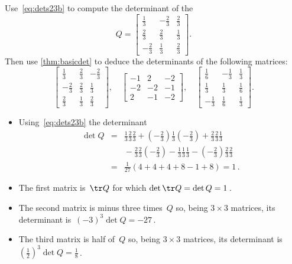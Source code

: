 \begin{example} \label{eg:}
Use~\eqref{eq:dets23b} to compute the determinant of the 
\begin{equation*}
Q=\begin{bmatrix} \frac13&-\frac23&\frac23
\\\frac23&\frac23&\frac13
\\-\frac23&\frac13&\frac23 \end{bmatrix}.
\end{equation*}
Then use \autoref{thm:basicdet} to deduce the determinants of the following matrices:
\begin{equation*}
\begin{bmatrix} \frac13&\frac23&-\frac23
\\-\frac23&\frac23&\frac13
\\\frac23&\frac13&\frac23 \end{bmatrix}
,\quad
\begin{bmatrix} -1&2&-2
\\-2&-2&-1
\\2&-1&-2 \end{bmatrix}
,\quad
\begin{bmatrix} \frac16&-\frac13&\frac13
\\\frac13&\frac13&\frac16
\\-\frac13&\frac16&\frac13 \end{bmatrix}.
\end{equation*}

\begin{solution} 
\begin{itemize}
\item Using~\eqref{eq:dets23b} the determinant
\begin{eqnarray*}
\det Q&=&\tfrac13\tfrac23\tfrac23+(-\tfrac23)\tfrac13(-\tfrac23)
+\tfrac23\tfrac23\tfrac13
\\&&{}-\tfrac23\tfrac23(-\tfrac23)
-\tfrac13\tfrac13\tfrac13-(-\tfrac23)\tfrac23\tfrac23
\\&=&\tfrac1{27}(4+4+4+8-1+8)=1\,.
\end{eqnarray*}

\item The first matrix is~\(\tr Q\) for which \(\det\tr Q=\det Q=1\)\,.

\item The second matrix is minus three times~\(Q\) so, being \(3\times3\) matrices, its determinant is~\((-3)^3\det Q=-27\)\,.

\item The third matrix is half of~\(Q\) so, being \(3\times3\) matrices, its determinant is~\((\tfrac12)^3\det Q=\frac18\)\,.
\end{itemize}
\end{solution}
\end{example}



